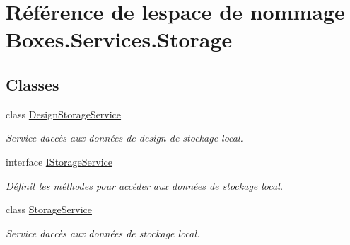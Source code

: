 \hypertarget{namespace_boxes_1_1_services_1_1_storage}{}\section{Référence de l\textquotesingle{}espace de nommage Boxes.\+Services.\+Storage}
\label{namespace_boxes_1_1_services_1_1_storage}
\subsection*{Classes}
\begin{DoxyCompactItemize}
\item 
class \hyperlink{class_boxes_1_1_services_1_1_storage_1_1_design_storage_service}{Design\+Storage\+Service}
\begin{DoxyCompactList}\small\item\em Service d\textquotesingle{}accès aux données de design de stockage local. \end{DoxyCompactList}\item 
interface \hyperlink{interface_boxes_1_1_services_1_1_storage_1_1_i_storage_service}{I\+Storage\+Service}
\begin{DoxyCompactList}\small\item\em Définit les méthodes pour accéder aux données de stockage local. \end{DoxyCompactList}\item 
class \hyperlink{class_boxes_1_1_services_1_1_storage_1_1_storage_service}{Storage\+Service}
\begin{DoxyCompactList}\small\item\em Service d\textquotesingle{}accès aux données de stockage local. \end{DoxyCompactList}\end{DoxyCompactItemize}
